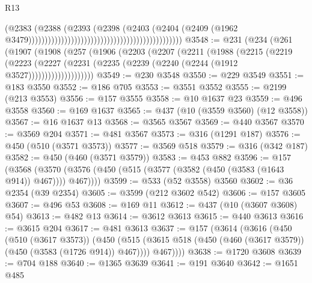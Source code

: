 \begin{lexlean}{R13}
\begin{coremodule}
                                                                                  (@2383
                                                                                    (@2388
                                                                                      (@2393
                                                                                        (@2398
                                                                                          (@2403
                                                                                            (@2404
                                                                                              (@2409
                                                                                                (@1962
                                                                                                  @3479)))))))))))))))))))))))))))))))))))))))))))))))
@3548 := @231
    (@234
      (@261
        (@1907
          (@1908
            (@257
              (@1906
                (@2203
                  (@2207
                    (@2211
                      (@1988
                        (@2215
                          (@2219
                            (@2223
                              (@2227
                                (@2231 (@2235 (@2239 (@2240 (@2244 (@1912 @3527))))))))))))))))))))
@3549 := @230 @3548
@3550 := @229 @3549
@3551 := @183 @3550
@3552 := @186 @705
@3553 := @3551 @3552
@3555 := @2199 (@213 @3553)
@3556 := @157 @3555
@3558 := @10 @1637 @23
@3559 := @496 @3558
@3560 := @169 @1637
@3565 := @437 (@10 (@3559 @3560) (@12 @3558))
@3567 := @16 @1637 @13
@3568 := @3565 @3567
@3569 := @440 @3567
@3570 := @3569 @204
@3571 := @481 @3567
@3573 := @316 (@1291 @187)
@3576 := @450 (@510 (@3571 @3573))
@3577 := @3569 @518
@3579 := @316 (@342 @187)
@3582 := @450 (@460 (@3571 @3579))
@3583 := @453 @882
@3596 := @157
    (@3568 (@3570 (@3576 (@450 (@515 (@3577 (@3582 (@450 (@3583 (@1643 @914)) @467)))) @467))))
@3599 := @533 (@52 @3558) @3560
@3602 := @36 @2354 (@39 @2354)
@3605 := @3599 (@212 @3602 @542)
@3606 := @157 @3605
@3607 := @496 @53
@3608 := @169 @11
@3612 := @437 (@10 (@3607 @3608) @54)
@3613 := @482 @13
@3614 := @3612 @3613
@3615 := @440 @3613
@3616 := @3615 @204
@3617 := @481 @3613
@3637 := @157
    (@3614
      (@3616
        (@450
          (@510 (@3617 @3573))
          (@450
            (@515 (@3615 @518 (@450 (@460 (@3617 @3579)) (@450 (@3583 (@1726 @914)) @467))))
            @467))))
@3638 := @1720 @3608
@3639 := @704 @188
@3640 := @1365 @3639
@3641 := @191 @3640
@3642 := @1651 @485

\end{coremodule}
\end{lexlean}
